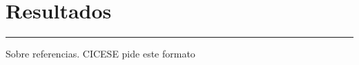 \chapter{Resultados}\label{capit:cap4}
\vspace{-2.0325ex}%
\noindent
\rule{\textwidth}{0.5pt}
\vspace{-5.5ex}%
\newcommand{\pushline}{\Indp}%

Sobre referencias. CICESE pide este formato \citep{Adleman1998}


\newpage
